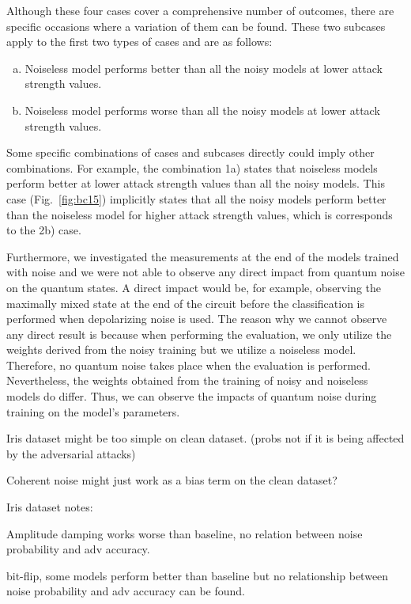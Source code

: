 Although these four cases cover a comprehensive number of outcomes,
there are specific occasions where a variation of them can be found.
These two subcases apply to the first two types of cases and are
as follows: \ 

\begin{enumerate}[a)]
  \item Noiseless model performs better than all the noisy models
        at lower attack strength values. \
  \item Noiseless model performs worse than all the noisy models
        at lower attack strength values. \
\end{enumerate}

Some specific combinations of cases and subcases directly could imply
other combinations. For example, the combination 1a) states that
noiseless models perform better at lower attack strength values than all
the noisy models. This case (Fig.~\ref{fig:bc15}) implicitly states
that all the noisy models perform better than the noiseless
model for higher attack strength values, which is corresponds to the
2b) case. \

Furthermore, we investigated the measurements at the end of the models
trained with noise and we were not able to observe any direct impact
from quantum noise on the quantum states. A direct impact would be,
for example, observing the maximally mixed state at the end of the
circuit before the classification is performed when depolarizing noise
is used. The reason why we cannot observe any direct result is because
when performing the evaluation, we only utilize the weights derived
from the noisy training but we utilize a noiseless model. Therefore,
no quantum noise takes place when the evaluation is performed. Nevertheless,
the weights obtained from the training of noisy and noiseless models do
differ. Thus, we can observe the impacts of quantum noise during training
on the model's parameters. \

\iffalse

Iris dataset might be too simple on clean dataset. (probs not if it is being affected by the adversarial attacks)

Coherent noise might just work as a bias term on the clean dataset? \

Iris dataset notes: \

Amplitude damping works worse than baseline, no relation between noise
probability and adv accuracy. \

bit-flip, some models perform better than baseline but no relationship
between noise probability and adv accuracy can be found. \

